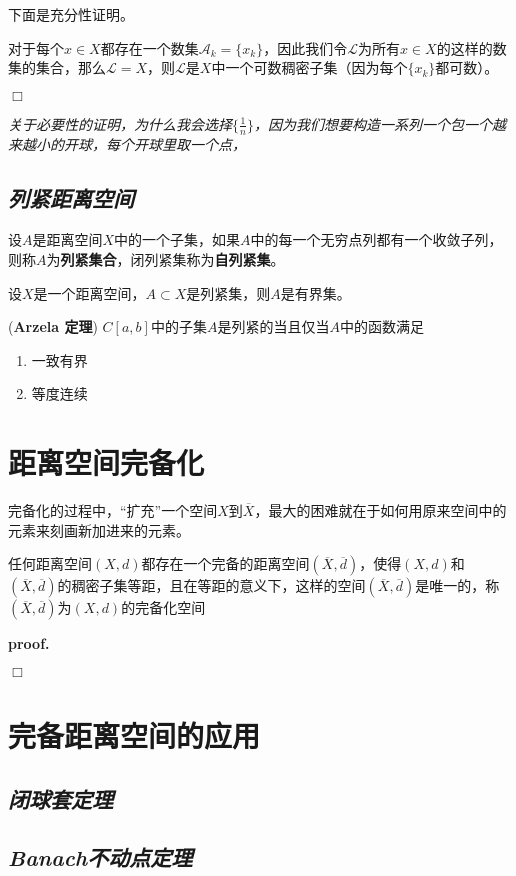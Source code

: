 下面是充分性证明。

对于每个$x\in X$都存在一个数集$\mathcal{A}_k=\{x_k\}$，因此我们令$\mathcal{L}$为所有$x\in X$的这样的数集的集合，那么$\mathcal{L}=X$，则$\mathcal{L}$是$X$中一个可数稠密子集（因为每个$\{x_k\}$都可数）。

$\Box$

\textsl{关于必要性的证明，为什么我会选择$\{\frac{1}{n}\}$，因为我们想要构造一系列一个包一个越来越小的开球，每个开球里取一个点，}

\subsection*{\textsl{列紧距离空间}}

设$A$是距离空间$X$中的一个子集，如果$A$中的每一个无穷点列都有一个收敛子列，则称$A$为\textbf{列紧集合}，闭列紧集称为\textbf{自列紧集}。

\begin{mdframed}
    \begin{theorem}
        设$X$是一个距离空间，$A\subset X$是列紧集，则$A$是有界集。
    \end{theorem}
\end{mdframed}

\begin{mdframed}
    \begin{theorem}
        (\textbf{Arzela 定理}) $C[a,b]$中的子集$A$是列紧的当且仅当$A$中的函数满足
        \begin{enumerate}[itemindent=2em]
            \item 一致有界
            \item 等度连续
        \end{enumerate}
    \end{theorem}
\end{mdframed}


\section{距离空间完备化}

完备化的过程中，“扩充”一个空间$X$到$\overline{X}$，最大的困难就在于如何用原来空间中的元素来刻画新加进来的元素。
\begin{mdframed}
    \begin{theorem}
        任何距离空间$(X,d)$都存在一个完备的距离空间$(\overline{X},\overline{d})$，使得$(X,d)$和$(\overline{X},\overline{d})$的稠密子集等距，且在等距的意义下，这样的空间$(\overline{X},\overline{d})$是唯一的，称$(\overline{X},\overline{d})$为$(X,d)$的完备化空间
    \end{theorem}
\end{mdframed}
\textbf{proof.} 

$\Box$

\section{完备距离空间的应用}

\subsection*{\textsl{闭球套定理}}

\subsection*{\textsl{Banach不动点定理}}


